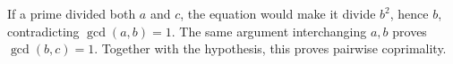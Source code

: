 If a prime divided both $a$ and $c$, the equation would make it divide $b^2$, hence $b$, contradicting $\gcd(a,b)=1$. The same argument interchanging $a,b$ proves $\gcd(b,c)=1$. Together with the hypothesis, this proves pairwise coprimality.
